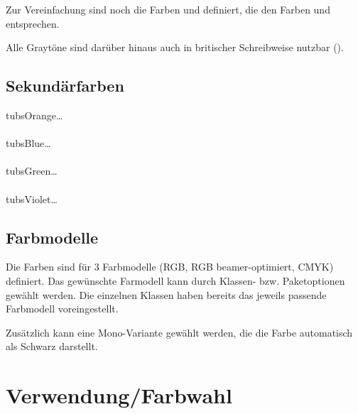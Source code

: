 
Zur Vereinfachung sind noch die Farben  und
 definiert, die den Farben  und
 entsprechen.

Alle Graytöne sind darüber hinaus auch in britischer Schreibweise nutzbar
().


\pagebreak
\subsection{Sekundärfarben}
  tubsOrange\ldots\\
  \\[-1ex]
  tubsBlue\ldots\\
  \\[-1ex]
  tubsGreen\ldots\\
  \\[-1ex]
  tubsViolet\ldots\\


% 

\subsection{Farbmodelle}

Die Farben sind für 3 Farbmodelle (\acrshort{RGB}, RGB beamer-optimiert, \acrshort{CMYK}) definiert.
Das gewünschte Farmodell kann durch Klassen- bzw. Paketoptionen gewählt werden.
Die einzelnen Klassen haben bereits das jeweils passende Farbmodell voreingestellt.

Zusätzlich kann eine Mono-Variante gewählt werden, die die Farbe
 automatisch als Schwarz darstellt.


\clearpage
\section{Verwendung/Farbwahl}
\sloppy

